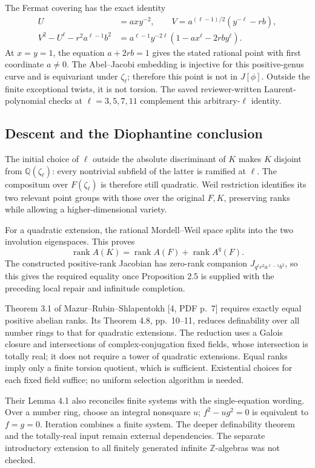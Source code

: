 \documentclass[10pt]{article}
\begin{document}
The Fermat covering has the exact identity \[\begin{split}
 U&=a x y^{-2},\qquad
 V=a^{(\ell-1)/2}(y^{-\ell}-rb),\\
 V^2-U^\ell-r^2a^{\ell-1}b^2
 &=a^{\ell-1}y^{-2\ell}(1-a x^\ell-2rb y^\ell).
\end{split}\] At \(x=y=1\), the equation \(a+2rb=1\) gives the stated rational point with first coordinate \(a\ne0\). The Abel–Jacobi embedding is injective for this positive-genus curve and is equivariant under \(\zeta_\ell\); therefore this point is not in \(J[\phi]\). Outside the finite exceptional twists, it is not torsion. The saved reviewer-written Laurent-polynomial checks at \(\ell=3,5,7,11\) complement this arbitrary-\(\ell\) identity.\par
\subsection*{Descent and the Diophantine conclusion}
The initial choice of \(\ell\) outside the absolute discriminant of \(K\) makes \(K\) disjoint from \(\mathbb Q(\zeta_\ell)\): every nontrivial subfield of the latter is ramified at \(\ell\). The compositum over \(F(\zeta_\ell)\) is therefore still quadratic. Weil restriction identifies its two relevant point groups with those over the original \(F,K\), preserving ranks while allowing a higher-dimensional variety.\par
For a quadratic extension, the rational Mordell–Weil space splits into the two involution eigenspaces. This proves \[\operatorname{rank}A(K)=\operatorname{rank}A(F)+\operatorname{rank}A^q(F).\] The constructed positive-rank Jacobian has zero-rank companion \(J_{q^\ell r^2a^{\ell-1}b^2}\), so this gives the required equality once Proposition 2.5 is supplied with the preceding local repair and infinitude completion.\par
Theorem 3.1 of Mazur–Rubin–Shlapentokh [4, PDF p. 7] requires exactly equal positive abelian ranks. Its Theorem 4.8, pp. 10–11, reduces definability over all number rings to that for quadratic extensions. The reduction uses a Galois closure and intersections of complex-conjugation fixed fields, whose intersection is totally real; it does not require a tower of quadratic extensions. Equal ranks imply only a finite torsion quotient, which is sufficient. Existential choices for each fixed field suffice; no uniform selection algorithm is needed.\par
Their Lemma 4.1 also reconciles finite systems with the single-equation wording. Over a number ring, choose an integral nonsquare \(u\); \(f^2-u g^2=0\) is equivalent to \(f=g=0\). Iteration combines a finite system. The deeper definability theorem and the totally-real input remain external dependencies. The separate introductory extension to all finitely generated infinite \(\mathbb Z\)-algebras was not checked.\par
\end{document}
